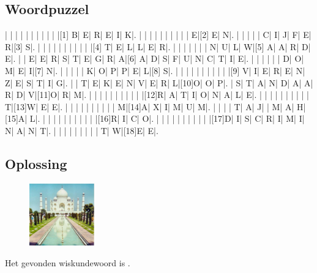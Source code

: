 \documentclass[12pt]{article}
\begin{document}
\subsection*{Woordpuzzel}

\begin{Puzzle}{22}{18}
|{}  |{}  |{}  |{}  |{}  |{}  |{}  |{}  |{}  |{}  |[1] B|   E|   R|   E|   I|   K|.
|{}  |{}  |{}  |{}  |{}  |{}  |{}  |{}  |{}  |   E|[2] E|   N|.
|{}  |{}  |{}  |{}  |   C|   I|   J|   F|   E|   R|[3] S|.
|{}  |{}  |{}  |{}  |{}  |{}  |{}  |{}  |{}  |{}  |[4] T|   E|   L|   L|   E|   R|.
|{}  |{}  |{}  |{}  |{}  |{}  |   N|   U|   L|   W|[5] A|   A|   R|   D|   E|.
|{}  |   E|   E|   R|   S|   T|   E|   G|   R|   A|[6] A|   D|   S|   F|   U|   N|   C|   T|   I|   E|.
|{}  |{}  |{}  |{}  |{}  |   D|   O|   M|   E|   I|[7] N|.
|{}  |{}  |{}  |{}  |   K|   O|   P|   P|   E|   L|[8] S|.
|{}  |{}  |{}  |{}  |{}  |{}  |{}  |{}  |{}  |{}  |[9] V|   I|   E|   R|   E|   N|   Z|   E|   S|   T|   I|   G|.
|{}  |   T|   E|   K|   E|   N|   V|   E|   R|   L|[10]O|   O|   P|.
|   S|   T|   A|   N|   D|   A|   A|   R|   D|   V|[11]O|   R|   M|.
|{}  |{}  |{}  |{}  |{}  |{}  |{}  |{}  |{}  |{}  |[12]R|   A|   T|   I|   O|   N|   A|   L|   E|.
|{}  |{}  |{}  |{}  |{}  |{}  |{}  |{}  |{}  |   T|[13]W|   E|   E|.
|{}  |{}  |{}  |{}  |{}  |{}  |{}  |{}  |{}  |   M|[14]A|   X|   I|   M|   U|   M|.
|{}  |{}  |{}  |   T|   A|   J|{}  |   M|   A|   H|[15]A|   L|.
|{}  |{}  |{}  |{}  |{}  |{}  |{}  |{}  |{}  |{}  |[16]R|   I|   C|   O|.
|{}  |{}  |{}  |{}  |{}  |{}  |{}  |{}  |{}  |{}  |[17]D|   I|   S|   C|   R|   I|   M|   I|   N|   A|   N|   T|.
|{}  |{}  |{}  |{}  |{}  |{}  |{}  |{}  |   T|   W|[18]E|   E|.
\end{Puzzle}

\subsection*{Oplossing}
\begin{figure}
  \vspace*{-2cm}
  \includegraphics[width=0.25\textwidth]{taj-mahal}
\end{figure}
Het gevonden wiskundewoord is \arule{5cm}.
\end{document}
